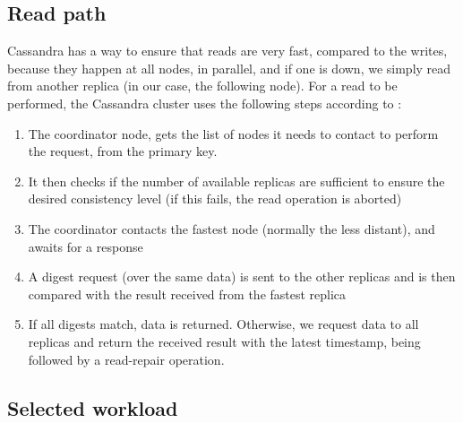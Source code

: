 \documentclass[runningheads]{llncs}
\begin{document}
\subsection{Read path}
Cassandra has a way to ensure that reads are very fast, compared to the writes, because they happen at all nodes, in parallel, and if one is down, we simply read from another replica (in our case, the following node).
For a read to be performed, the Cassandra cluster uses the following steps according to \cite{simplilearn}:
\begin{enumerate}
    \item The coordinator node, gets the list of nodes it needs to contact to perform the request, from the primary key.
    \item It then checks if the number of available replicas are sufficient to ensure the desired consistency level (if this fails, the read operation is aborted)
    \item The coordinator contacts the fastest node (normally the less distant), and awaits for a response
    \item A digest request (over the same data) is sent to the other replicas and is then compared with the result received from the fastest replica
    \item If all digests match, data is returned. Otherwise, we request data to all replicas and return the received result with the latest timestamp, being followed by a read-repair operation.
\end{enumerate}

\subsection{Selected workload}
\end{document}
